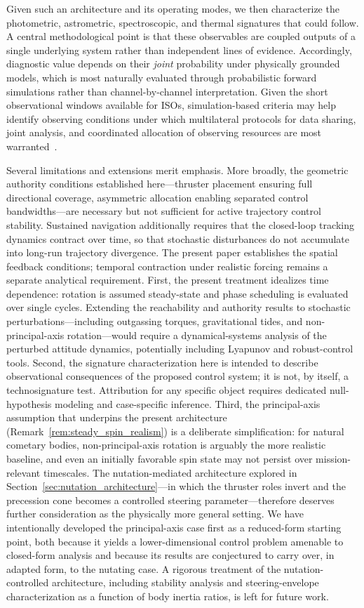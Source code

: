 \documentclass{article}
\begin{document}
Given such an architecture and its operating modes, we then characterize the photometric, astrometric, spectroscopic, and thermal signatures that could follow. A central methodological point is that these observables are coupled outputs of a single underlying system rather than independent lines of evidence. Accordingly, diagnostic value depends on their \emph{joint} probability under physically grounded models, which is most naturally evaluated through probabilistic forward simulations rather than channel-by-channel interpretation. Given the short observational windows available for ISOs, simulation-based criteria may help identify observing conditions under which multilateral protocols for data sharing, joint analysis, and coordinated allocation of observing resources are most warranted~\cite{eldadi2025}.

Several limitations and extensions merit emphasis. More broadly, the geometric authority conditions established here---thruster placement ensuring full directional coverage, asymmetric allocation enabling separated control bandwidths---are necessary but not sufficient for active trajectory control stability. Sustained navigation additionally requires that the closed-loop tracking dynamics contract over time, so that stochastic disturbances do not accumulate into long-run trajectory divergence. The present paper establishes the spatial feedback conditions; temporal contraction under realistic forcing remains a separate analytical requirement. First, the present treatment idealizes time dependence: rotation is assumed steady-state and phase scheduling is evaluated over single cycles. Extending the reachability and authority results to stochastic perturbations---including outgassing torques, gravitational tides, and non-principal-axis rotation---would require a dynamical-systems analysis of the perturbed attitude dynamics, potentially including Lyapunov and robust-control tools. Second, the signature characterization here is intended to describe observational consequences of the proposed control system; it is not, by itself, a technosignature test. Attribution for any specific object requires dedicated null-hypothesis modeling and case-specific inference. Third, the principal-axis assumption that underpins the present architecture (Remark~\ref{rem:steady_spin_realism}) is a deliberate simplification: for natural cometary bodies, non-principal-axis rotation is arguably the more realistic baseline, and even an initially favorable spin state may not persist over mission-relevant timescales. The nutation-mediated architecture explored in Section~\ref{sec:nutation_architecture}---in which the thruster roles invert and the precession cone becomes a controlled steering parameter---therefore deserves further consideration as the physically more general setting. We have intentionally developed the principal-axis case first as a reduced-form starting point, both because it yields a lower-dimensional control problem amenable to closed-form analysis and because its results are conjectured to carry over, in adapted form, to the nutating case. A rigorous treatment of the nutation-controlled architecture, including stability analysis and steering-envelope characterization as a function of body inertia ratios, is left for future work.
\end{document}
